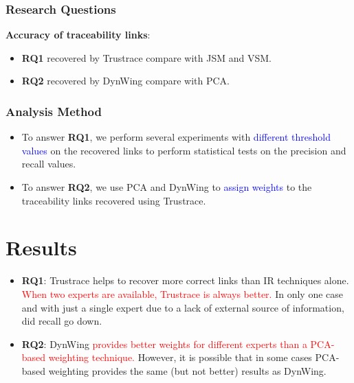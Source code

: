 \documentclass[12pt,hyperref=true,mathserif]{beamer}
\begin{document}
\begin{frame}
\frametitle{Research Questions}
\textbf{Accuracy of traceability links}:
\begin{itemize}
  \item \textbf{RQ1} recovered by Trustrace compare with JSM and VSM.\\[8pt]
  \item \textbf{RQ2} recovered by DynWing compare with PCA.
\end{itemize}
\end{frame}

\begin{frame}
\frametitle{Analysis Method}
\begin{itemize}
  \item To answer \textbf{RQ1}, we perform several experiments with \textcolor{blue}{different threshold values} on the recovered links to perform statistical tests on the precision and recall values.\\[8pt]
  \item To answer \textbf{RQ2}, we use PCA and DynWing to \textcolor{blue}{assign weights} to the traceability links recovered using Trustrace.
\end{itemize}
\end{frame}


\section{Results}
\begin{frame}
\begin{itemize}
  \item \textbf{RQ1}: Trustrace helps to recover more correct links than IR techniques alone. \textcolor{red}{When two experts are available, Trustrace is always better.} In only one case and with just a single expert due to a lack of external source of information, did recall go down.\\[8pt]
  \item \textbf{RQ2}: DynWing \textcolor{red}{provides better weights for different experts than a PCA-based weighting technique.} However, it is possible that in some cases PCA-based weighting provides the same (but not better) results as DynWing.
\end{itemize}
\end{frame}
\end{document}
